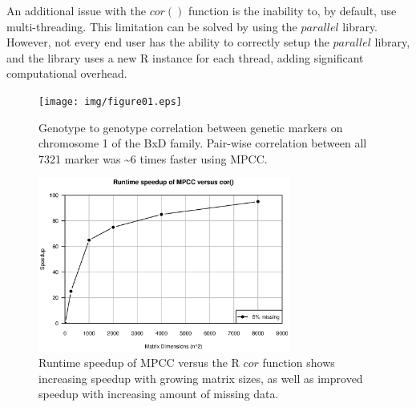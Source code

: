 \documentclass{bioinfo}
\begin{document}
An additional issue with the $cor()$ function is the inability to, by default, use 
multi-threading. This limitation can be solved by using the $parallel$ library. 
However, not every end user has the ability to correctly setup the $parallel$ 
library, and the library uses a new R instance for each thread, adding significant 
computational overhead.
\vspace*{-5mm}
\begin{figure}[!t]
  \centerline{\texttt{[image: img/figure01.eps]}}
  \vspace*{-7mm}
  \caption{
    Genotype to genotype correlation between genetic markers on chromosome 
    1 of the BxD family. Pair-wise correlation between all 7321 marker was \textasciitilde{}6 times 
    faster using MPCC.
  }
  \label{fig:fig1}
  \vspace*{-5mm}
\end{figure}
\begin{figure}[!t]
  \centerline{\includegraphics[width=235pt]{img/figure02.eps}}
  \vspace*{-7mm}
  \caption{
    Runtime speedup of MPCC versus the R $cor$ function shows 
    increasing speedup with growing matrix sizes, as well as improved 
    speedup with increasing amount of missing data. 
  }
  \label{fig:fig2}
  \vspace*{-5mm}
\end{figure}
\end{document}
